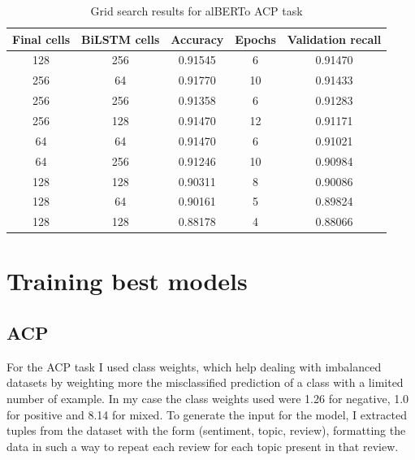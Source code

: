 \documentclass{article}
\begin{document}
            \begin{table}[h!]
                \begin{center}
                \caption{Grid search results for alBERTo ACP task}
                \label{tab:table3}
                \begin{tabular}{c|c|c|c|c}
                    \textbf{Final cells} & \textbf{BiLSTM cells} & \textbf{Accuracy} & \textbf{Epochs} & \textbf{Validation recall}\\
                    \hline
                        128 & 256 & 0.91545 & 6  & 0.91470\\
                        256 & 64  & 0.91770 & 10 & 0.91433\\
                        256 & 256 & 0.91358 & 6  & 0.91283\\
                        256 & 128 & 0.91470 & 12 & 0.91171\\
                        64  & 64  & 0.91470 & 6  & 0.91021\\
                        64  & 256 & 0.91246 & 10 & 0.90984\\
                        128 & 128 & 0.90311 & 8  & 0.90086\\
                        128 & 64  & 0.90161 & 5  & 0.89824\\
                        128 & 128 & 0.88178 & 4  & 0.88066\\
                \end{tabular}
                \end{center}
            \end{table}


    \section{Training best models}\label{sec:training-best-models}
        \subsection{ACP}\label{subsec:s1}
            For the ACP task I used class weights, which help dealing with imbalanced datasets by weighting more the misclassified prediction of a class
            with a limited number of example.
            In my case the class weights used were 1.26 for negative, 1.0 for positive and 8.14 for mixed.
            To generate the input for the model, I extracted tuples from the dataset with the form (sentiment, topic, review), formatting the data in such a way to repeat each review for each topic present in that review.
\end{document}
